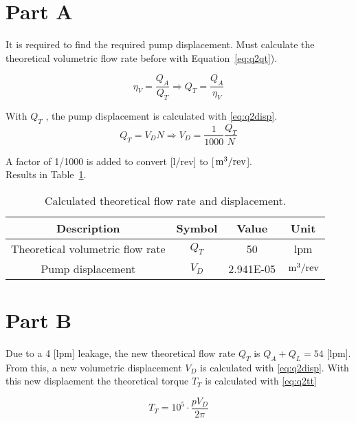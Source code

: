 \section{Part A}
\label{sect:2a}

It is required to find the required pump displacement. Must calculate the theoretical volumetric flow rate before with Equation~\ref{eq:q2qt}). 

\begin{equation}
	\label{eq:q2qt}
	\eta_V = \frac{Q_A}{Q_T} \Rightarrow Q_T = \frac{Q_A}{\eta_V}
\end{equation}

With $Q_T$ , the pump displacement is calculated with \ref{eq:q2disp}.
\begin{equation}
	\label{eq:q2disp}
	Q_T = V_D N \Rightarrow V_D = \frac{1}{1000}\frac{Q_T}{N}
\end{equation}

A factor of 1/1000 is added to convert [l/rev] to [$\,\mathrm{m^3/rev}$].\\

Results in Table~\ref{tab:q2a}.

\begin{table}[H]
  \centering
  \caption{Calculated theoretical flow rate and displacement.}
    \begin{tabular}{cccc}
    \toprule
    \textbf{Description} & \textbf{Symbol} & \textbf{Value } & \textbf{Unit} \\
    \midrule
    Theoretical volumetric flow rate & $Q_T$ & 50    & lpm \\
    Pump displacement & $V_D$ & 2.941E-05 & $\,\mathrm{m^3/rev}$ \\
    \bottomrule
    \end{tabular}
  \label{tab:q2a}
\end{table}


\section{Part B}
\label{sect:2b}

Due to a 4 [lpm] leakage, the new theoretical flow rate $Q_T$ is $Q_A+Q_L=54$ [lpm]. From this, a new volumetric displacement $V_D$ is calculated with \ref{eq:q2disp}. With this new displaement the theoretical torque $T_T$ is calculated with \ref{eq:q2tt}

\begin{equation}
	\label{eq:q2tt}
	T_T = 10^5 \cdot \frac{p V_D}{2 \pi}
\end{equation}

